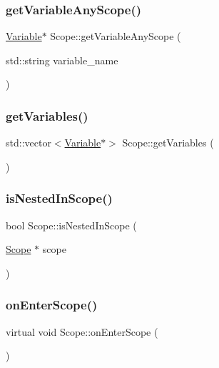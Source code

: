 \subsubsection{\texorpdfstring{get\+Variable\+Any\+Scope()}{getVariableAnyScope()}}
{\footnotesize\ttfamily \hyperlink{classVariable}{Variable}$\ast$ Scope\+::get\+Variable\+Any\+Scope (\begin{DoxyParamCaption}\item[{std\+::string}]{variable\+\_\+name }\end{DoxyParamCaption})}

\mbox{\label{classScope_adb9ef772a81d2d5ce883298e43161a2d}} 
\subsubsection{\texorpdfstring{get\+Variables()}{getVariables()}}
{\footnotesize\ttfamily std\+::vector$<$\hyperlink{classVariable}{Variable}$\ast$$>$ Scope\+::get\+Variables (\begin{DoxyParamCaption}{ }\end{DoxyParamCaption})}

\mbox{\label{classScope_a340e72ca6fa7b3b85760e8b13e75fb16}} 
\subsubsection{\texorpdfstring{is\+Nested\+In\+Scope()}{isNestedInScope()}}
{\footnotesize\ttfamily bool Scope\+::is\+Nested\+In\+Scope (\begin{DoxyParamCaption}\item[{\hyperlink{classScope}{Scope} $\ast$}]{scope }\end{DoxyParamCaption})}

\mbox{\label{classScope_a4a42aaa7bd341ef07a90ef51860f0a8a}} 
\subsubsection{\texorpdfstring{on\+Enter\+Scope()}{onEnterScope()}}
{\footnotesize\ttfamily virtual void Scope\+::on\+Enter\+Scope (\begin{DoxyParamCaption}{ }\end{DoxyParamCaption})\hspace{0.3cm}{\ttfamily [virtual]}}



